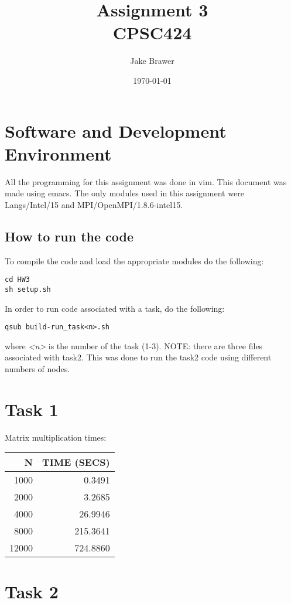 \documentclass[11pt]{article}
\author{Jake Brawer}
\date{\today}
\title{Assignment 3\\\medskip
\large CPSC424}
\begin{document}
\maketitle

\section{Software and Development Environment}
\label{sec:orgc177360}

All the programming for this assignment was done in vim. This document was made using emacs. The only modules used in this assignment were Langs/Intel/15 and MPI/OpenMPI/1.8.6-intel15.

\subsection{How to run the code}
\label{sec:org8c2e3a5}

To compile the code and load the appropriate modules do the following:
\begin{verbatim}
cd HW3
sh setup.sh
\end{verbatim}

In order to run code associated with a task, do the following:
\begin{verbatim}
qsub build-run_task<n>.sh
\end{verbatim}
where \emph{<n>} is the number of the task (1-3). NOTE: there are three files associated with task2. This was done to run the task2 code using different numbers of nodes.

\section{Task 1}
\label{sec:org8e35c1e}

Matrix multiplication times:

\begin{center}
\begin{tabular}{rr}
N & TIME (SECS)\\
\hline
1000 & 0.3491\\
2000 & 3.2685\\
4000 & 26.9946\\
8000 & 215.3641\\
12000 & 724.8860\\
\end{tabular}
\end{center}

\section{Task 2}
\label{sec:orgb808fd7}
\end{document}
